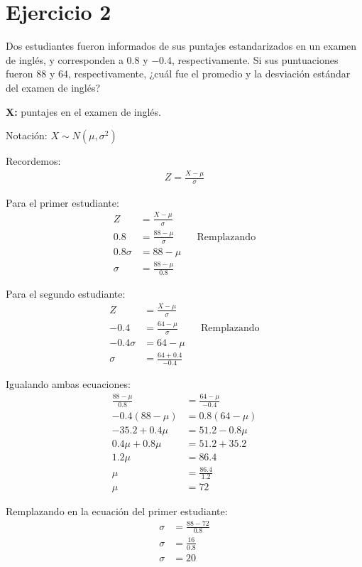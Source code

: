 \documentclass{templateNote}
\begin{document}
\newpage
\section*{Ejercicio 2}
Dos estudiantes fueron informados de sus puntajes estandarizados en un examen de inglés, y corresponden a $0.8$ y $-0.4$, respectivamente. Si sus puntuaciones fueron $88$ y $64$, respectivamente, ¿cuál fue el promedio y la desviación estándar del examen de inglés?

\textbf{X:} puntajes en el examen de inglés.

Notación: $X \sim N(\mu, \sigma^2)$

Recordemos:
\begin{align*}
  Z = \frac{X - \mu}{\sigma}
\end{align*}

Para el primer estudiante:
\begin{align*}
  Z &= \frac{X - \mu}{\sigma} \\
  0.8 &= \frac{88 - \mu}{\sigma} && \text{Remplazando} \\
  0.8\sigma &= 88 - \mu \\
  \sigma &= \frac{88 - \mu}{0.8}
\end{align*}

Para el segundo estudiante:
\begin{align*}
  Z &= \frac{X - \mu}{\sigma} \\
  -0.4 &= \frac{64 - \mu}{\sigma} && \text{Remplazando} \\
  -0.4\sigma &= 64 - \mu \\
  \sigma &= \frac{64 + 0.4}{-0.4}
\end{align*}

Igualando ambas ecuaciones:
\begin{align*}
  \frac{88 - \mu}{0.8} &= \frac{64 - \mu}{-0.4} \\
  -0.4(88 - \mu) &= 0.8(64 - \mu) \\
  -35.2 + 0.4\mu &= 51.2 - 0.8\mu \\
  0.4\mu + 0.8\mu &= 51.2 + 35.2 \\
  1.2\mu &= 86.4 \\
  \mu &= \frac{86.4}{1.2} \\
  \mu &= 72
\end{align*}

Remplazando en la ecuación del primer estudiante:
\begin{align*}
  \sigma &= \frac{88 - 72}{0.8} \\
  \sigma &= \frac{16}{0.8} \\
  \sigma &= 20
\end{align*}
\end{document}
